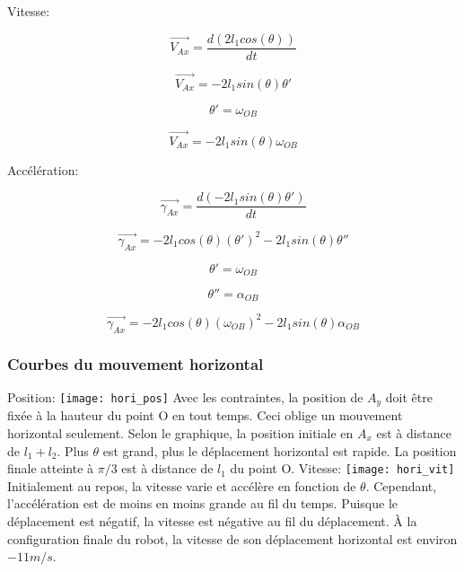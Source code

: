 \documentclass{article}
\begin{document}
\noindent Vitesse:

\begin{equation}
\overrightarrow{V_{Ax}} = \frac{d(2l_1cos(\theta))}{dt}
\end{equation}

\begin{equation}
\overrightarrow{V_{Ax}} = -2l_1sin(\theta)\theta'
\end{equation}

\begin{equation}
\theta' = \omega_{OB}
\end{equation}

\begin{equation}
\overrightarrow{V_{Ax}} = -2l_1sin(\theta)\omega_{OB}
\end{equation}

\newpage
\noindent Accélération:

\begin{equation}
\overrightarrow{\gamma_{Ax}} = \frac{d(-2l_1sin(\theta)\theta')}{dt}
\end{equation}

\begin{equation}
\overrightarrow{\gamma_{Ax}} = -2l_1cos(\theta)(\theta')^2-2l_1sin(\theta)\theta''
\end{equation}

\begin{equation}
\theta' = \omega_{OB}
\end{equation}

\begin{equation}
\theta'' = \alpha_{OB}
\end{equation}

\begin{equation}
\overrightarrow{\gamma_{Ax}} = -2l_1cos(\theta)(\omega_{OB})^2-2l_1sin(\theta)\alpha_{OB}
\end{equation}

\subsubsection{Courbes du mouvement horizontal}
\noindent Position:
\newline
\noindent \texttt{[image: hori\_pos]}
Avec les contraintes, la position de $A_y$ doit être fixée à la hauteur du point O en tout temps. Ceci oblige un mouvement horizontal seulement. Selon le graphique, la position initiale en $A_x$ est à distance de $l_1 + l_2$. Plus $\theta$ est grand, plus le déplacement horizontal est rapide. La position finale atteinte à $\pi/3$ est à distance de $l_1$ du point O.
\newline
\newline
\noindent Vitesse:
\newline
\noindent \texttt{[image: hori\_vit]}
Initialement au repos, la vitesse varie et accélère en fonction de $\theta$. Cependant, l'accélération est de moins en moins grande au fil du temps. Puisque le déplacement est négatif, la vitesse est négative au fil du déplacement. À la configuration finale du robot, la vitesse de son déplacement horizontal est environ $-11 m/s$.
\end{document}
